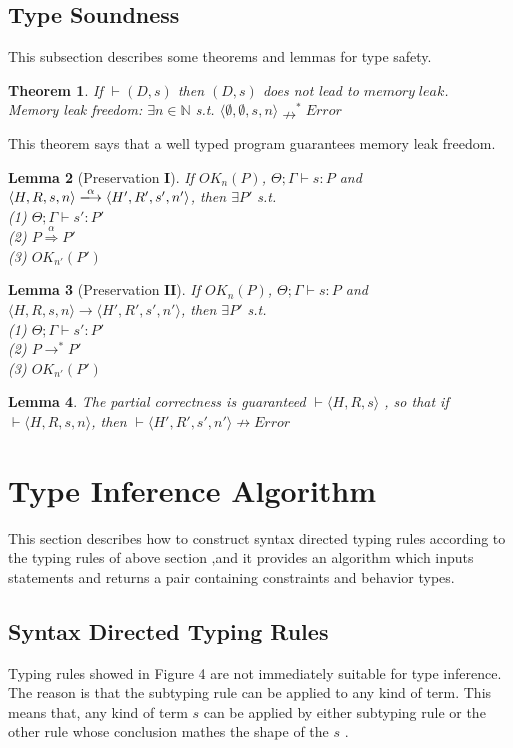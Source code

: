 \documentclass[english]{jssst_ppl} %
\newtheorem{theorem}{Theorem}[section]
\newtheorem{lemma}[theorem]{Lemma}
\begin{document}
\subsection{Type Soundness}
This subsection describes some theorems and lemmas for type safety.
\begin{theorem}\label{thm1}
If $\vdash (D, s)$ then $(D, s)$ does not lead to $memory\;leak$.\\
Memory leak freedom: $\exists n \in \mathbb{N}$ s.t.
$\langle \emptyset, \emptyset, s, n \rangle \nrightarrow^{*}Error$
\end{theorem}
\noindent
This theorem says that a well typed program guarantees memory leak freedom.
\begin{lemma}[Preservation $\mathbf{I}$]%
If $OK_{n}(P)$, $\Theta; \Gamma \vdash s : P$ and $\langle H,R,s, n \rangle
\xlongrightarrow{\alpha}\langle H',R',s', n'
\rangle$, then $\exists P'$ s.t. \\
(1) $ \Theta; \Gamma \vdash s' : P' $ \\
(2) $ P \overset{\text{$\alpha$}}{\Longrightarrow} P'$\\
(3) $ OK_{n'}(P') $
\end{lemma}
\begin{lemma}[Preservation $\mathbf{II}$]%
If $OK_{n}(P)$, $\Theta ; \Gamma \vdash s : P$ and $\langle H,R,s,n \rangle
\rightarrow \langle H',R',s', n'
\rangle$, then $\exists P'$ s.t. \\
(1) $\Theta; \Gamma \vdash s' : P'$\\
(2) $ P \rightarrow^{*} P'  $\\
(3) $OK_{n'}(P')$
\end{lemma}
\begin{lemma}%
 The partial correctness is guaranteed $\vdash \langle H,R,s \rangle$ , so that if $\vdash \langle H,R,s,n \rangle$, then $\vdash \langle H',R',s',n' \rangle \nrightarrow Error$
\end{lemma}
\section{Type Inference Algorithm}
This section describes how to construct syntax directed typing rules according to the typing rules of above section ,and it provides an algorithm which inputs statements and returns a pair containing constraints and behavior types.
\subsection{Syntax Directed Typing Rules}
Typing rules showed in Figure 4 are not immediately suitable for type inference. The reason is that the subtyping rule can be applied to any kind of term. This means that, any kind of term $s$ can be applied by either subtyping rule or the other rule whose conclusion mathes the shape of the $s$ \cite{plain:book1}.
\end{document}

